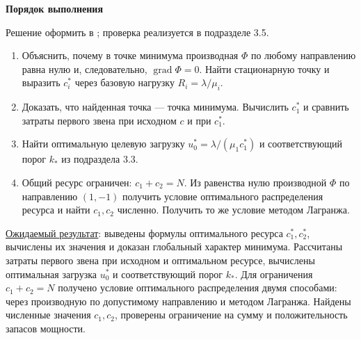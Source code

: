 \documentclass[12pt,a4paper]{article}
\newcommand{\taskhead}[1]{\par\textbf{#1}\par}
\begin{document}
\taskhead{Порядок выполнения}
Решение оформить в ; проверка реализуется в подразделе 3.5.
\begin{enumerate}
\item Объяснить, почему в точке минимума производная $\Phi$ по любому направлению
равна нулю и, следовательно, $\operatorname{grad}\Phi=0$.
Найти стационарную точку и выразить $c_i^*$ через базовую нагрузку $R_i=\lambda/\mu_i$.
\item Доказать, что найденная точка --- точка минимума. Вычислить $c_1^*$
и сравнить затраты первого звена при исходном $c$ и при $c_1^*$.
\item Найти оптимальную целевую загрузку $u_0^*=\lambda/(\mu_1c_1^*)$
и соответствующий порог $k_*$ из подраздела 3.3.
\item Общий ресурс ограничен: $c_1+c_2=N$. Из равенства нулю производной
$\Phi$ по направлению $(1,-1)$ получить условие оптимального распределения
ресурса и найти $c_1,c_2$ численно. Получить то же условие методом Лагранжа.
\end{enumerate}
\underline{Ожидаемый результат}: выведены формулы оптимального ресурса
$c_1^*,c_2^*$, вычислены их значения и доказан глобальный характер минимума.
Рассчитаны затраты первого звена при исходном и оптимальном ресурсе,
вычислены оптимальная загрузка $u_0^*$ и соответствующий порог $k_*$.
Для ограничения $c_1+c_2=N$ получено условие оптимального распределения
двумя способами: через производную по допустимому направлению
и методом Лагранжа. Найдены численные значения $c_1,c_2$,
проверены ограничение на сумму и положительность запасов мощности.
\end{document}
